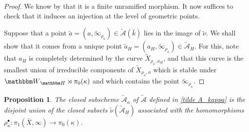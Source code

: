 \documentclass[12pt,english]{smfart}
\numberwithin{equation}{subsection}
\newtheorem{proposition}[equation]{Proposition}
\theoremstyle{remark}
\newcommand\calA{{\mathscr A}}
\newcommand\HH{{\mathbbm H}}
\newcommand\bbW{{\mathbbm W}}
\begin{document}
\begin{proof}
We know by \cite[10.3]{N} that it is a finite unramified morphism. It now suffices to check that it induces an injection at the level of geometric points.

Suppose that a point $\tilde a=(a,\tilde\infty_{\rho_\kappa})\in\tilde\calA(\bar k)$ lies in the image of $\tilde\nu$. We shall show that it comes from a unique point $\tilde a_H=(a_H,\tilde\infty_{\rho_\kappa})\in\tilde\calA_H$. For this, note that $a_H$ is completely determined by the curve $\widetilde X_{\rho_\kappa,a_H}$, and that this curve is the smallest union of irreducible components of $\widetilde X_{\rho_\kappa,a}$ which is stable under $\bbW_\HH\rtimes\pi_0(\kappa)$ and which contains the point $\tilde\infty_{\rho_\kappa}$.
\end{proof}

\begin{proposition}\label{Galois}
The closed subscheme $\tilde\calA_\kappa$ of $\tilde\calA$ defined in \ref{tilde A_kappa} is the disjoint union of the closed subsets $\tilde\nu(\tilde\calA_H)$ associated with the homomorphisms $\rho_\kappa^\bullet:\pi_1(\bar X,\infty)\rightarrow\pi_0(\kappa)$.
\end{proposition}
\end{document}
